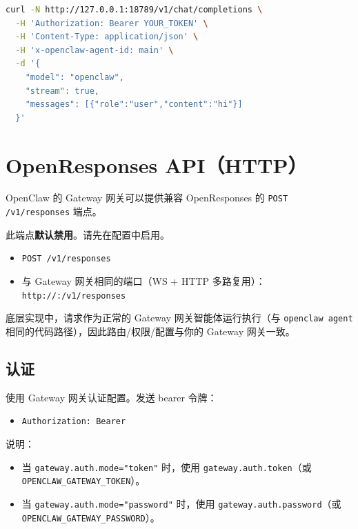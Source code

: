 \begin{lstlisting}[language=bash]
curl -N http://127.0.0.1:18789/v1/chat/completions \
  -H 'Authorization: Bearer YOUR_TOKEN' \
  -H 'Content-Type: application/json' \
  -H 'x-openclaw-agent-id: main' \
  -d '{
    "model": "openclaw",
    "stream": true,
    "messages": [{"role":"user","content":"hi"}]
  }'
\end{lstlisting}



\clearpage

\section{OpenResponses API（HTTP）}


OpenClaw 的 Gateway 网关可以提供兼容 OpenResponses 的 \texttt{POST /v1/responses} 端点。

此端点\textbf{默认禁用}。请先在配置中启用。

\begin{itemize}
  \item \texttt{POST /v1/responses}
  \item 与 Gateway 网关相同的端口（WS + HTTP 多路复用）：\texttt{http://:/v1/responses}
\end{itemize}


底层实现中，请求作为正常的 Gateway 网关智能体运行执行（与 \texttt{openclaw agent} 相同的代码路径），因此路由/权限/配置与你的 Gateway 网关一致。

\subsection{认证}


使用 Gateway 网关认证配置。发送 bearer 令牌：

\begin{itemize}
  \item \texttt{Authorization: Bearer }
\end{itemize}


说明：

\begin{itemize}
  \item 当 \texttt{gateway.auth.mode="token"} 时，使用 \texttt{gateway.auth.token}（或 \texttt{OPENCLAW\_GATEWAY\_TOKEN}）。
  \item 当 \texttt{gateway.auth.mode="password"} 时，使用 \texttt{gateway.auth.password}（或 \texttt{OPENCLAW\_GATEWAY\_PASSWORD}）。
\end{itemize}


